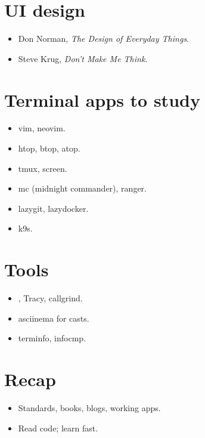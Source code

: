 \section{UI design}

\begin{itemize}[leftmargin=*]
  \item Don Norman, \emph{The Design of Everyday Things}.
  \item Steve Krug, \emph{Don't Make Me Think}.
\end{itemize}

\section{Terminal apps to study}

\begin{itemize}[leftmargin=*]
  \item vim, neovim.
  \item htop, btop, atop.
  \item tmux, screen.
  \item mc (midnight commander), ranger.
  \item lazygit, lazydocker.
  \item k9s.
\end{itemize}

\section{Tools}

\begin{itemize}[leftmargin=*]
  \item {}, Tracy, callgrind.
  \item asciinema for casts.
  \item terminfo, infocmp.
\end{itemize}

\section{Recap}

\begin{recap}
\begin{itemize}[leftmargin=*]
  \item Standards, books, blogs, working apps.
  \item Read code; learn fast.
\end{itemize}
\end{recap}
